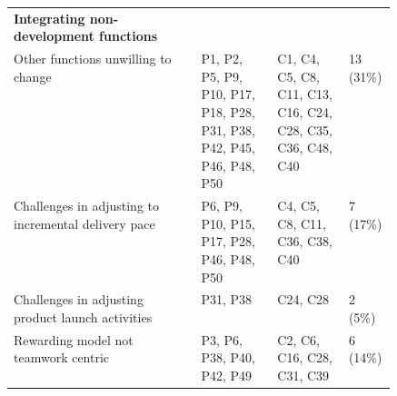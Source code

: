 \begin{table}[tbp]
\begin{centering}
\begin{tabularx}{\linewidth}{>{\raggedright\arraybackslash}p{0.49\linewidth}X}
        \midrule
        {\textbf{Integrating non-development functions}} \\ \addlinespace
        Other functions unwilling to change                   & P1, P2, P5, P9, P10, P17, P18, P28, P31, P38, P42, P45, P46, P48, P50 
                                                              & C1, C4, C5, C8, C11, C13, C16, C24, C28, C35, C36, C48, C40       & 13 (31\%) \\ \addlinespace
        Challenges in adjusting to incremental delivery pace  & P6, P9, P10, P15, P17, P28, P46, P48, P50
                                                              & C4, C5, C8, C11, C36, C38, C40                                    & 7 (17\%) \\ \addlinespace
        Challenges in adjusting product launch activities     & P31, P38                        & C24, C28                        & 2 (5\%)  \\ \addlinespace
        Rewarding model not teamwork centric                  & P3, P6, P38, P40, P42, P49      & C2, C6, C16, C28, C31, C39      & 6 (14\%) \\

        \bottomrule
    \end{tabularx}
\end{centering}
\end{table}
